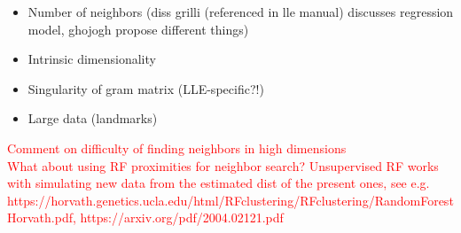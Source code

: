 \begin{itemize}
  \item Number of neighbors (diss grilli (referenced in lle manual) discusses 
  regression model, ghojogh propose different things)
  \item Intrinsic dimensionality
  \item Singularity of gram matrix (LLE-specific?!)
  \item Large data (landmarks)
\end{itemize}

\textcolor{red}{Comment on difficulty of finding neighbors in high dimensions}
\\
\textcolor{red}{What about using RF proximities for neighbor search? 
Unsupervised RF works with simulating new data from the estimated dist of the 
present ones, see e.g. https://horvath.genetics.ucla.edu/html/RFclustering/RFclustering/RandomForestHorvath.pdf, https://arxiv.org/pdf/2004.02121.pdf}
